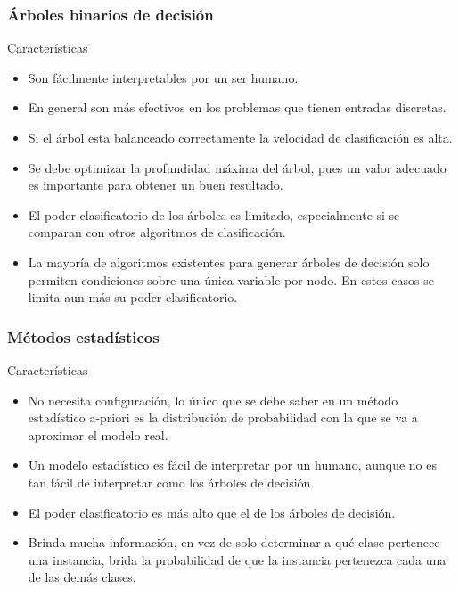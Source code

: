 \documentclass{beamer}
\begin{document}
	\begin{frame}
	\frametitle{Árboles binarios de decisión}
	\begin{block}{Características}
	\begin{itemize}	
	\item Son fácilmente interpretables por un ser humano. \pause
	\item En general son más efectivos en los problemas que tienen entradas discretas. \pause	
	\item Si el árbol esta balanceado correctamente la velocidad de clasificación es alta. \pause	
	\item Se debe optimizar la profundidad máxima del árbol, pues un valor adecuado es importante para obtener un buen resultado. \pause
	\item El poder clasificatorio de los árboles es limitado, especialmente si se comparan con otros algoritmos de clasificación. \pause	
	\item La mayoría de algoritmos existentes para generar árboles de decisión solo permiten condiciones sobre una única variable por nodo. En estos casos se limita aun más su poder clasificatorio. 
	\end{itemize}
	\end{block}
	\end{frame}
	
	\begin{frame}
	\frametitle{Métodos estadísticos}
	\begin{block}{Características}
	\begin{itemize}
	\item No necesita configuración, lo único que se debe saber en un método estadístico a-priori es la distribución de probabilidad con la que se va a aproximar el modelo real. \pause
	\item Un modelo estadístico es fácil de interpretar por un humano, aunque no es tan fácil de interpretar como los árboles de decisión. \pause
	\item El poder clasificatorio es más alto que el de los árboles de decisión. \pause
	\item Brinda mucha información, en vez de solo determinar a qué clase pertenece una instancia, brida la probabilidad de que la instancia pertenezca cada una de las demás clases.
	\end{itemize}
	\end{block}
	\end{frame}
	
\end{document}
